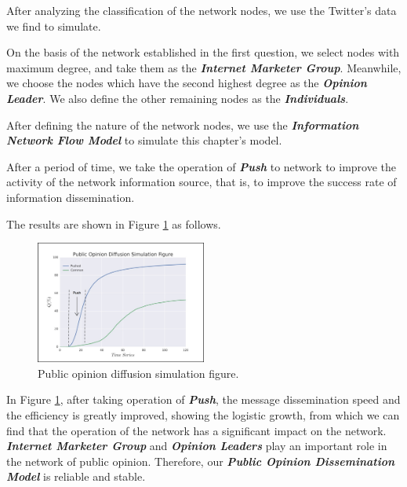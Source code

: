 \documentclass[a4paper,11pt]{article}
\begin{document}
\par After analyzing the classification of the network nodes, we use the Twitter's data we find to simulate.
\par On the basis of the network established in the first question, we select nodes with maximum degree, and take them as the \textbf{\emph{Internet Marketer Group}}. Meanwhile, we choose the nodes which have the second highest degree as the \textbf{\emph{Opinion Leader}}. We also define the other remaining nodes as the \textbf{\emph{Individuals}}.
\par After defining the nature of the network nodes, we use the \textbf{\emph{Information Network Flow Model}} to simulate this chapter's model.
\par After a period of time, we take the operation of \textbf{\emph{Push}} to network to improve the activity of the network information source, that is, to improve the success rate of information dissemination.
\par The results are shown in Figure \ref{fig:P4} as follows.


\begin{figure}[h]%
    \centering 
    \includegraphics[width=0.5\textwidth]{./Pic/P4.jpg}
    \caption{Public opinion diffusion simulation figure.}
    \label{fig:P4}  
\end{figure}

\par In Figure \ref{fig:P4}, after taking operation of \textbf{\emph{Push}}, the message dissemination speed and the efficiency is greatly improved, showing the logistic growth, from which we can find that the operation of the network has a significant impact on the network. \textbf{\emph{Internet Marketer Group}} and \textbf{\emph{Opinion Leaders}} play an important role in the network of public opinion. Therefore, our \textbf{\emph{Public Opinion Dissemination Model}} is reliable and stable.
\end{document}
